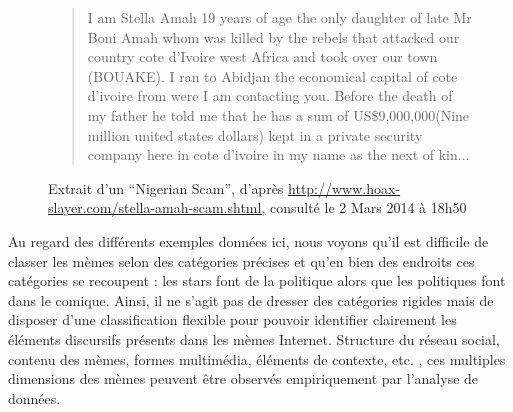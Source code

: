 \begin{description}
\begin{figure}[htpb]
    \begin{quote}
        I am Stella Amah 19 years of age the only daughter of late Mr Boni Amah whom was killed by the rebels that attacked our country cote d'Ivoire west Africa and took over our town (BOUAKE). I ran to Abidjan the economical capital of cote d'ivoire from were I am contacting you. Before the death of my father he told me that he has a sum of US\$9,000,000(Nine million united states dollars) kept in a private security company here in cote d'ivoire in my name as the next of kin... 
    \end{quote}
    \caption[Extrait d'un spam du type \textit{Nigerian Scam}]{
        Extrait d{\textquoteright}un {\textquotedblleft}Nigerian Scam{\textquotedblright}, d{\textquoteright}après \url{http://www.hoax-slayer.com/stella-amah-scam.shtml,} consulté le 2 Mars 2014 à 18h50
    }
    \label{fig:nigerian-scam}
\end{figure}

\end{description}

Au regard des différents exemples données ici, nous voyons qu{\textquoteright}il est difficile de classer les mèmes selon des catégories précises et qu{\textquoteright}en bien des endroits ces catégories se recoupent : les stars font de la politique alors que les politiques font dans le comique. Ainsi, il ne s{\textquoteright}agit pas de dresser des catégories rigides mais de disposer d{\textquoteright}une classification flexible pour pouvoir identifier clairement les éléments discursifs présents dans les mèmes Internet. Structure du réseau social, contenu des mèmes, formes multimédia, éléments de contexte, etc. , ces multiples dimensions des mèmes peuvent être observés empiriquement par l{\textquoteright}analyse de données.